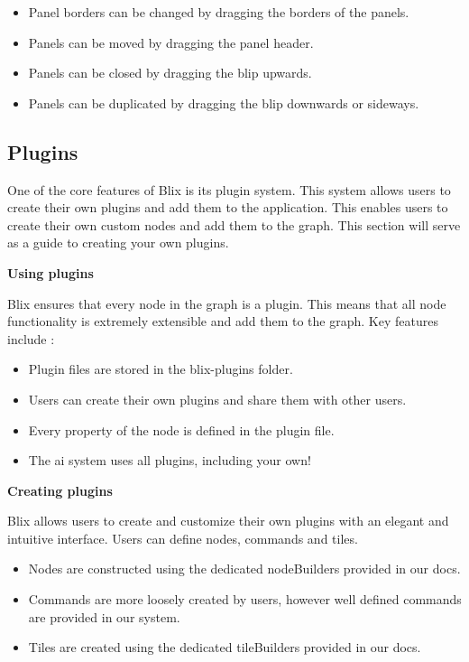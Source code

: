 \documentclass[11pt,a4paper]{article}
\begin{document}
\begin{itemize}
  \item[\textbullet] Panel borders can be changed by dragging the borders of the panels.
  \item[\textbullet] Panels can be moved by dragging the panel header.
  \item[\textbullet] Panels can be closed by dragging the blip upwards.
  \item[\textbullet] Panels can be duplicated by dragging the blip downwards or sideways.
\end{itemize}


\subsection*{Plugins}

One of the core features of Blix is its plugin system. This system allows users to create their own plugins and add them to the application. This enables users to create their own custom nodes and 
add them to the graph. This section will serve as a guide to creating your own plugins.

\textbf{Using plugins}

Blix ensures that every node in the graph is a plugin. This means that all node functionality is extremely extensible and add them to the graph. Key features include : 

\begin{itemize}
  \item[\textbullet] Plugin files are stored in the blix-plugins folder.
  \item[\textbullet] Users can create their own plugins and share them with other users.
  \item[\textbullet] Every property of the node is defined in the plugin file.
  \item[\textbullet] The ai system uses all plugins, including your own!
\end{itemize}

\textbf{Creating plugins}

Blix allows users to create and customize their own plugins with an elegant and intuitive interface. Users can define nodes, commands and tiles.

\begin{itemize}
  \item[\textbullet] Nodes are constructed using the dedicated nodeBuilders provided in our docs.
  \item[\textbullet] Commands are more loosely created by users, however well defined commands are provided in our system.
  \item[\textbullet] Tiles are created using the dedicated tileBuilders provided in our docs.
\end{itemize}
\end{document}
